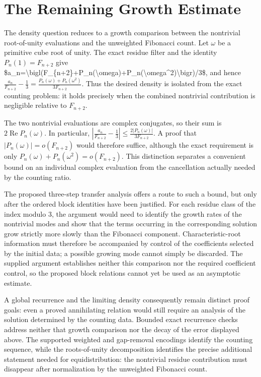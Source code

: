 \documentclass[11pt]{article}
\begin{document}
\section{The Remaining Growth Estimate}
The density question reduces to a growth comparison between the nontrivial root-of-unity evaluations and the unweighted Fibonacci count. Let $\omega$ be a primitive cube root of unity. The exact residue filter and the identity $P_n(1)=F_{n+2}$ give \$a\_n=\textbackslash{}bigl(F\_\{n+2\}+P\_n(\textbackslash{}omega)+P\_n(\textbackslash{}omega\textasciicircum{}2)\textbackslash{}bigr)/3\$, and hence $\frac{a_n}{F_{n+2}}-\frac13=\frac{P_n(\omega)+P_n(\omega^2)}{3F_{n+2}}$. Thus the desired density is isolated from the exact counting problem: it holds precisely when the combined nontrivial contribution is negligible relative to $F_{n+2}$.

The two nontrivial evaluations are complex conjugates, so their sum is $2\operatorname{Re}P_n(\omega)$. In particular, $\left|\frac{a_n}{F_{n+2}}-\frac13\right|\leq\frac{2|P_n(\omega)|}{3F_{n+2}}$. A proof that $|P_n(\omega)|=o(F_{n+2})$ would therefore suffice, although the exact requirement is only $P_n(\omega)+P_n(\omega^2)=o(F_{n+2})$. This distinction separates a convenient bound on an individual complex evaluation from the cancellation actually needed by the counting ratio.

The proposed three-step transfer analysis offers a route to such a bound, but only after the ordered block identities have been justified. For each residue class of the index modulo $3$, the argument would need to identify the growth rates of the nontrivial modes and show that the terms occurring in the corresponding solution grow strictly more slowly than the Fibonacci component. Characteristic-root information must therefore be accompanied by control of the coefficients selected by the initial data; a possible growing mode cannot simply be discarded. The supplied argument establishes neither this comparison nor the required coefficient control, so the proposed block relations cannot yet be used as an asymptotic estimate.

A global recurrence and the limiting density consequently remain distinct proof goals: even a proved annihilating relation would still require an analysis of the solution determined by the counting data. Bounded exact recurrence checks address neither that growth comparison nor the decay of the error displayed above. The supported weighted and gap-removal encodings identify the counting sequence, while the roots-of-unity decomposition identifies the precise additional statement needed for equidistribution: the nontrivial residue contribution must disappear after normalization by the unweighted Fibonacci count.
\end{document}
